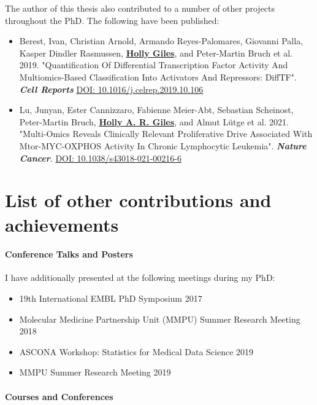 \documentclass[11pt, a4paper, twosided]{book}
\begin{document}
    The author of this thesis also contributed to a number of other projects throughout the PhD. The following have been published:
    \begin{itemize}
        \item Berest, Ivan\ast, Christian Arnold\ast, Armando Reyes-Palomares, Giovanni Palla, Kasper Dindler Rasmussen, \textbf{\underline{Holly Giles}}, and Peter-Martin Bruch et al. 2019. "Quantification Of Differential Transcription Factor Activity And Multiomics-Based Classification Into Activators And Repressors: DiffTF". \textbf{\textit{Cell Reports}} \href{https://doi.org/10.1016/j.celrep.2019.10.106}{DOI: 10.1016/j.celrep.2019.10.106}
        
      \item Lu, Junyan\ast, Ester Cannizzaro\ast, Fabienne Meier-Abt, Sebastian Scheinost, Peter-Martin Bruch, \textbf{\underline{Holly A. R. Giles}}, and Almut Lütge et al. 2021. "Multi-Omics Reveals Clinically Relevant Proliferative Drive Associated With Mtor-MYC-OXPHOS Activity In Chronic Lymphocytic Leukemia". \textbf{\textit{Nature Cancer}}. \href{https://doi.org/10.1038/s43018-021-00216-6}{DOI: 10.1038/s43018-021-00216-6}
    \end{itemize}
\newpage\null\newpage

    \hypertarget{list-of-other-contributions-and-achievements}{%
    \chapter*{List of other contributions and achievements}\label{list-of-other-contributions-and-achievements}}

    \hypertarget{conference-talks-and-posters}{%
    \subsubsection*{Conference Talks and Posters}\label{conference-talks-and-posters}}

    I have additionally presented at the following meetings during my PhD:
    \begin{itemize}
      \item  19th International EMBL PhD Symposium 2017
      \item  Molecular Medicine Partnership Unit (MMPU) Summer Research Meeting 2018
      \item  ASCONA Workshop: Statistics for Medical Data Science 2019
      \item  MMPU Summer Research Meeting 2019
    \end{itemize}
    \hypertarget{courses-and-conferences}{%
    \subsubsection*{Courses and Conferences}\label{courses-and-conferences}}
\end{document}
